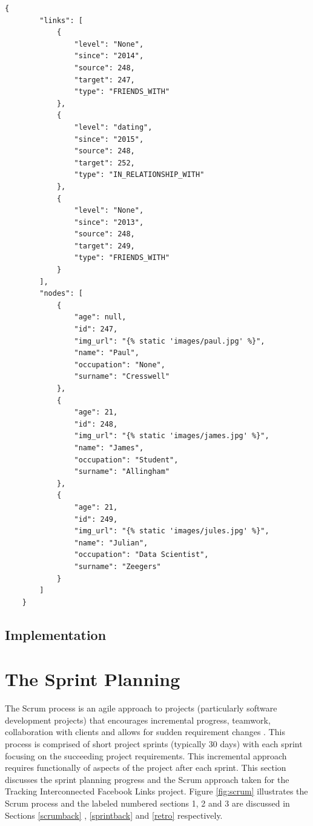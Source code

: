 \documentclass[12pt,onecolumn]{article}
\begin{document}
	\begin{lstlisting}[caption=test,captionpos=b,label=list:dbjson]
	{
	    "links": [
	        {
	            "level": "None", 
	            "since": "2014", 
	            "source": 248, 
	            "target": 247, 
	            "type": "FRIENDS_WITH"
	        }, 
	        {
	            "level": "dating", 
	            "since": "2015", 
	            "source": 248, 
	            "target": 252, 
	            "type": "IN_RELATIONSHIP_WITH"
	        }, 
	        {
	            "level": "None", 
	            "since": "2013", 
	            "source": 248, 
	            "target": 249, 
	            "type": "FRIENDS_WITH"
	        }
	    ], 
	    "nodes": [
	        {
	            "age": null, 
	            "id": 247, 
	            "img_url": "{% static 'images/paul.jpg' %}", 
	            "name": "Paul", 
	            "occupation": "None", 
	            "surname": "Cresswell"
	        }, 
	        {
	            "age": 21, 
	            "id": 248, 
	            "img_url": "{% static 'images/james.jpg' %}", 
	            "name": "James", 
	            "occupation": "Student", 
	            "surname": "Allingham"
	        }, 
	        {
	            "age": 21, 
	            "id": 249, 
	            "img_url": "{% static 'images/jules.jpg' %}", 
	            "name": "Julian", 
	            "occupation": "Data Scientist", 
	            "surname": "Zeegers"
	        }
	    ]
	}

	\end{lstlisting} 
	
	\subsection{Implementation} %
	
	\section{The Sprint Planning}
	The Scrum process is an agile approach to projects (particularly software development projects) that encourages incremental progress, teamwork, collaboration with clients and allows for sudden requirement changes \cite{Cohn}. This process is comprised of short project sprints (typically 30 days) with each sprint focusing on the succeeding project requirements. This incremental approach requires functionally of aspects of the project after each sprint. This section discusses the sprint planning progress and the Scrum approach taken for the Tracking Interconnected Facebook Links project. Figure \ref{fig:scrum} illustrates the Scrum process and the labeled numbered sections 1, 2 and 3 are discussed in Sections  \ref{scrumback} ,  \ref{sprintback} and  \ref{retro} respectively.
	
\end{document}
